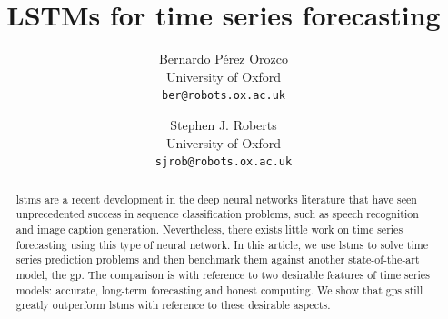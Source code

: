 \documentclass[pdftex,10pt,a4paper,journal]{article}
\title{\huge LSTMs for time series forecasting }
\author{Bernardo P\'erez Orozco\\University of Oxford\\\texttt{ber@robots.ox.ac.uk} \and Stephen J. Roberts\\University of Oxford\\\texttt{sjrob@robots.ox.ac.uk}}
\theoremstyle{definition}
\theoremstyle{remark}
\begin{document}
\maketitle


\begin{abstract}
    \acrshort*{lstm}s are a recent development in the deep neural networks literature that have seen unprecedented success in sequence classification problems, such as speech recognition and image caption generation. Nevertheless, there exists little work on time series forecasting using this type of neural network. In this article, we use \acrshort*{lstm}s to solve time series prediction problems and then benchmark them against another state-of-the-art model, the \acrlong*{gp}. The comparison is with reference to two desirable features of time series models: accurate, long-term forecasting and honest computing. We show that \acrshort*{gp}s still greatly outperform \acrshort*{lstm}s with reference to these desirable aspects.
\end{abstract}
\end{document}
